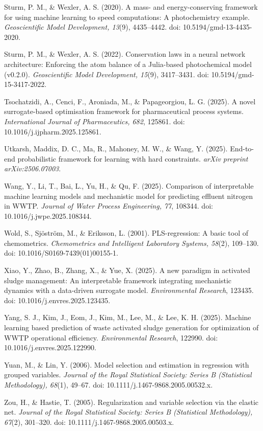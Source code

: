 \documentclass[a4paper,fleqn]{cas-sc}
\begin{document}
\noindent Sturm, P. M., \& Wexler, A. S. (2020). A mass- and energy-conserving framework for using machine learning to speed computations: A photochemistry example. \textit{Geoscientific Model Development, 13}(9), 4435--4442. doi: 10.5194/gmd-13-4435-2020.

\noindent Sturm, P. M., \& Wexler, A. S. (2022). Conservation laws in a neural network architecture: Enforcing the atom balance of a Julia-based photochemical model (v0.2.0). \textit{Geoscientific Model Development, 15}(9), 3417--3431. doi: 10.5194/gmd-15-3417-2022.

\noindent Tsochatzidi, A., Cenci, F., Aroniada, M., \& Papageorgiou, L. G. (2025). A novel surrogate-based optimisation framework for pharmaceutical process systems. \textit{International Journal of Pharmaceutics, 682}, 125861. doi: 10.1016/j.ijpharm.2025.125861.

\noindent Utkarsh, Maddix, D. C., Ma, R., Mahoney, M. W., \& Wang, Y. (2025). End-to-end probabilistic framework for learning with hard constraints. \textit{arXiv preprint arXiv:2506.07003}.

\noindent Wang, Y., Li, T., Bai, L., Yu, H., \& Qu, F. (2025). Comparison of interpretable machine learning models and mechanistic model for predicting effluent nitrogen in WWTP. \textit{Journal of Water Process Engineering, 77}, 108344. doi: 10.1016/j.jwpe.2025.108344.

\noindent Wold, S., Sj\"ostr\"om, M., \& Eriksson, L. (2001). PLS-regression: A basic tool of chemometrics. \textit{Chemometrics and Intelligent Laboratory Systems, 58}(2), 109--130. doi: 10.1016/S0169-7439(01)00155-1.

\noindent Xiao, Y., Zhao, B., Zhang, X., \& Yue, X. (2025). A new paradigm in activated sludge management: An interpretable framework integrating mechanistic dynamics with a data-driven surrogate model. \textit{Environmental Research}, 123435. doi: 10.1016/j.envres.2025.123435.

\noindent Yang, S. J., Kim, J., Eom, J., Kim, M., Lee, M., \& Lee, K. H. (2025). Machine learning based prediction of waste activated sludge generation for optimization of WWTP operational efficiency. \textit{Environmental Research}, 122990. doi: 10.1016/j.envres.2025.122990.

\noindent Yuan, M., \& Lin, Y. (2006). Model selection and estimation in regression with grouped variables. \textit{Journal of the Royal Statistical Society: Series B (Statistical Methodology), 68}(1), 49--67. doi: 10.1111/j.1467-9868.2005.00532.x.

\noindent Zou, H., \& Hastie, T. (2005). Regularization and variable selection via the elastic net. \textit{Journal of the Royal Statistical Society: Series B (Statistical Methodology), 67}(2), 301--320. doi: 10.1111/j.1467-9868.2005.00503.x.
\end{document}
